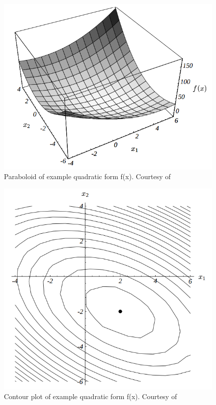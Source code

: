 \documentclass[en]{minipw} %
\begin{document}
\begin{figure}[h!]
\centering
\includegraphics[scale=0.5]{pictures/paraboloid.png}
\caption[Logo MiNI]{Paraboloid of example quadratic form f(x). Courtesy of~\cite{cg}}
\end{figure}

\begin{figure}[h!]
\centering
\includegraphics[scale=0.5]{pictures/contour.png}
\caption[Logo MiNI]{Contour plot of example quadratic form f(x). Courtesy of~\cite{cg}}
\end{figure}
\end{document}
